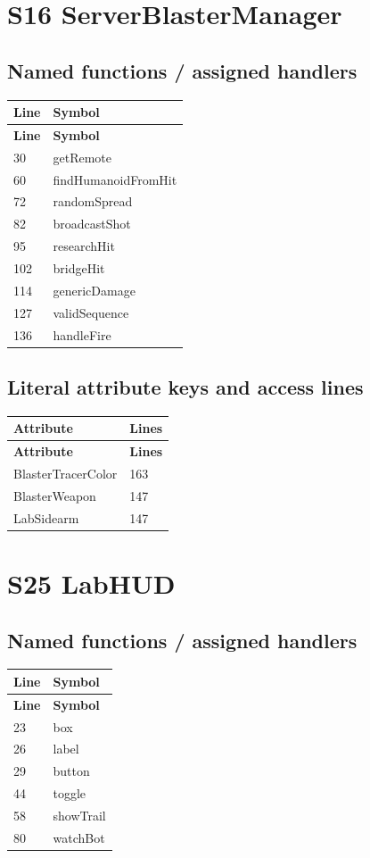 \section{S16 ServerBlasterManager}
\subsection{Named functions /\allowbreak{} assigned handlers}
\begin{longtable}{p{}p{}}
\toprule
\textbf{Line} & \textbf{Symbol} \\ \midrule
\endfirsthead
\textbf{Line} & \textbf{Symbol} \\ \midrule
\endhead
30 & getRemote \\
60 & findHumanoidFromHit \\
72 & randomSpread \\
82 & broadcastShot \\
95 & researchHit \\
102 & bridgeHit \\
114 & genericDamage \\
127 & validSequence \\
136 & handleFire \\
\bottomrule
\end{longtable}
\subsection{Literal attribute keys and access lines}
\begin{longtable}{p{}p{}}
\toprule
\textbf{Attribute} & \textbf{Lines} \\ \midrule
\endfirsthead
\textbf{Attribute} & \textbf{Lines} \\ \midrule
\endhead
BlasterTracerColor & 163 \\
BlasterWeapon & 147 \\
LabSidearm & 147 \\
\bottomrule
\end{longtable}
\section{S25 LabHUD}
\subsection{Named functions /\allowbreak{} assigned handlers}
\begin{longtable}{p{}p{}}
\toprule
\textbf{Line} & \textbf{Symbol} \\ \midrule
\endfirsthead
\textbf{Line} & \textbf{Symbol} \\ \midrule
\endhead
23 & box \\
26 & label \\
29 & button \\
44 & toggle \\
58 & showTrail \\
80 & watchBot \\
\bottomrule
\end{longtable}
